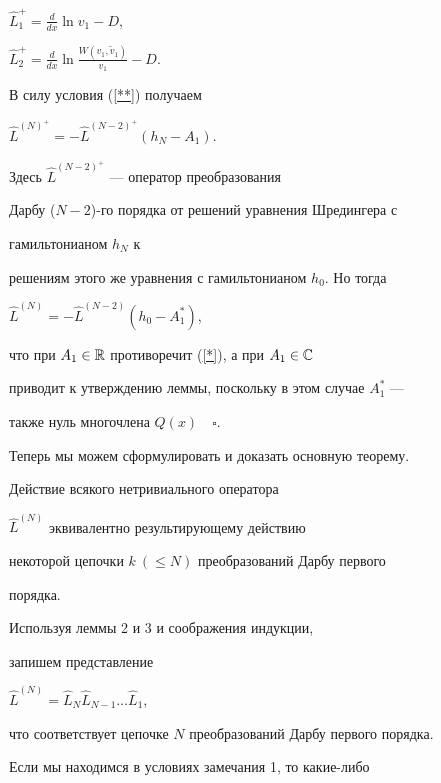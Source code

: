 $\widehat{L}_1^{+}=\frac d{dx}\ln v_1-D$,


$\widehat{L}_2^{+}=


\frac d{dx}\ln \frac{W(v_1,\widetilde{v}_1)}{v_1}-D$.


В силу условия (\ref{**}) получаем


$\widehat{L}^{(N)^{+}}=-\widehat{L}^{(N-2)^{+}}(h_N-A_1)$.


Здесь $\widehat{L}^{(N-2)^{+}}$ --- оператор преобразования


Дарбу ($N{-}2$)-го порядка от решений уравнения Шредингера с


гамильтонианом $h_N$ к


решениям этого же уравнения с гамильтонианом $h_0$. Но тогда


$\widehat{L}^{(N)}=-\widehat{L}^{(N-2)}(h_0-A_1^{*})$,


что при $A_1\in {\Bbb R}$ противоречит (\ref{*}), а при $A_1\in{\Bbb C}$


приводит к утверждению леммы, поскольку в этом случае $A_1^{*}$ ---


также нуль многочлена $Q(x)\quad\square$.


\medskip





Теперь мы можем сформулировать и доказать основную теорему.





\begin{thmnonum}


Действие всякого нетривиального оператора


$\widehat{L}^{(N)}$ эквивалентно результирующему действию


некоторой  цепочки $k\ (\leq N)$ преобразований Дарбу первого


порядка.


\end{thmnonum}





Используя леммы 2 и 3 и соображения индукции,


запишем представление


$\widehat{L}^{(N)}{=}\widehat{L}_N\widehat{L}_{N-1}\dotsc\widehat{L}_1$,


что соответствует цепочке $N$ преобразований Дарбу первого порядка.


Если мы находимся в условиях замечания 1, то какие-либо


